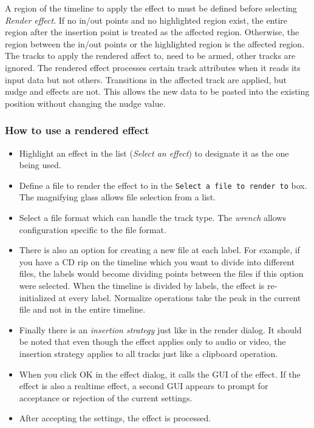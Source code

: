 A region of the timeline to apply the effect to must be defined before selecting \textit{Render effect}. If no in/out points and no highlighted region exist, the entire region after the insertion point is treated as the affected region. Otherwise, the region between the in/out points or the highlighted region is the affected region. The tracks to apply the rendered affect to, need to be armed, other tracks are ignored. The rendered effect processes certain track attributes when it reads its input data but not others. Transitions in the affected track are applied, but nudge and effects are not. This allows the new data to be pasted into the existing position without changing the nudge value.

\subsubsection*{How to use a rendered effect}%
\label{ssub:how_use_rendered_effect}

\begin{itemize}
    \item Highlight an effect in the list (\textit{Select an effect}) to designate it as the one being used.
    \item Define a file to render the effect to in the \texttt{Select a file to render to} box. The magnifying glass allows file selection from a list.
    \item Select a file format which can handle the track type. The \textit{wrench} allows configuration specific to the file format.
    \item There is also an option for creating a new file at each label. For example, if you have a CD rip on the timeline which you want to divide into different files, the labels would become dividing points between the files if this option were selected. When the timeline is divided by labels, the effect is re-initialized at every label. Normalize operations take the peak in the current file and not in the entire timeline.
    \item Finally there is an \textit{insertion strategy} just like in the render dialog. It should be noted that even though the effect applies only to audio or video, the insertion strategy applies to all tracks just like a clipboard operation.
    \item When you click OK in the effect dialog, it calls the GUI of the effect. If the effect is also a realtime effect, a second GUI appears to prompt for acceptance or rejection of the current settings.
    \item After accepting the settings, the effect is processed.
\end{itemize}

